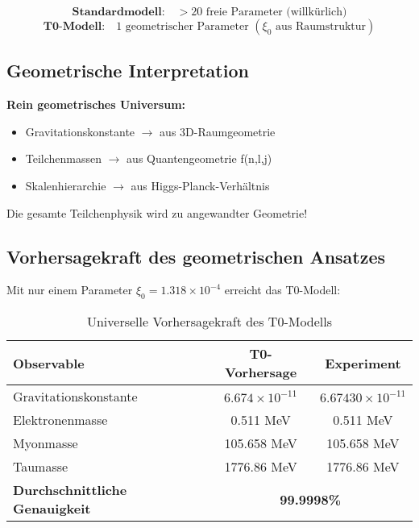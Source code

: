 \documentclass[12pt,a4paper]{article}
\begin{document}
	\begin{equation}
		\textbf{Standardmodell:} \quad >20 \text{ freie Parameter (willkürlich)}
	\end{equation}
	\begin{equation}
		\textbf{T0-Modell:} \quad 1 \text{ geometrischer Parameter } (\xi_0 \text{ aus Raumstruktur})
	\end{equation}
	
	\subsection{Geometrische Interpretation}
	
	\begin{tcolorbox}[colback=orange!5!white,colframe=orange!75!black,title=Einsteins Vision erfüllt]
		\textbf{Rein geometrisches Universum:}
		\begin{itemize}
			\item Gravitationskonstante $\rightarrow$ aus 3D-Raumgeometrie
			\item Teilchenmassen $\rightarrow$ aus Quantengeometrie f(n,l,j)  
			\item Skalenhierarchie $\rightarrow$ aus Higgs-Planck-Verhältnis
		\end{itemize}
		
		Die gesamte Teilchenphysik wird zu angewandter Geometrie!
	\end{tcolorbox}
	
	\subsection{Vorhersagekraft des geometrischen Ansatzes}
	
	Mit nur einem Parameter $\xi_0 = 1.318 \times 10^{-4}$ erreicht das T0-Modell:
	
	\begin{table}[h]
		\centering
		\begin{tabular}{@{}lcc@{}}
			\toprule
			\textbf{Observable} & \textbf{T0-Vorhersage} & \textbf{Experiment} \\
			\midrule
			Gravitationskonstante & $6.674 \times 10^{-11}$ & $6.67430 \times 10^{-11}$ \\
			Elektronenmasse & 0.511 MeV & 0.511 MeV \\
			Myonmasse & 105.658 MeV & 105.658 MeV \\
			Taumasse & 1776.86 MeV & 1776.86 MeV \\
			\midrule
			\textbf{Durchschnittliche Genauigkeit} & \multicolumn{2}{c}{\textbf{99.9998\%}} \\
			\bottomrule
		\end{tabular}
		\caption{Universelle Vorhersagekraft des T0-Modells}
	\end{table}
	
\end{document}
